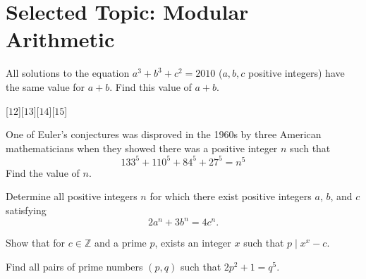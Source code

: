 

\DeclareRobustCommand{\stirling}{\genfrac\{\}{0pt}{}}
\setcounter{secnumdepth}{0} 

\newcommand{\weekNum}{5} %
\newcommand{\meetingDate}{February 19th, 2025} 


\pagestyle{empty}
\sloppy
\maketitle

\section{Selected Topic: Modular Arithmetic} %

\begin{problem}
    All solutions to the equation \( a^3 + b^3 + c^2 = 2010 \) (\( a, b, c \) positive integers) have the same value for \( a + b \). Find this value of \( a + b \).
\end{problem}
[$12$][$13$][$14$][$15$]

\begin{problem}[N][4][AIME 1989/9]
    One of Euler's conjectures was disproved in the 1960s by three American mathematicians when they showed there was a positive integer $n$ such that
    $$ 133^5 + 110^5 + 84^5 + 27^5 = n^5 $$
    Find the value of $n$.
\end{problem}

\begin{problem}[N][4][Putnam 2024/A1]
    Determine all positive integers $n$ for which there exist positive integers $a$, $b$, and $c$ satisfying
    \[
    2a^n + 3b^n = 4c^n.
    \]
\end{problem}

\begin{problem}[N][3][AoPS]
    Show that for $c \in \mathbb{Z}$ and a prime $p$, exists an integer $x$ such that $p \mid  x^x - c$.
\end{problem}

\begin{problem}[N][4]
    Find all pairs of prime numbers $(p,q)$ such that $2p^2 + 1 = q^5$.
\end{problem}

